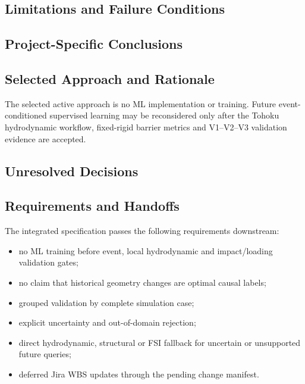 
\subsection{Limitations and Failure Conditions}
\label{sec:res-ml-spec-limitations}


\subsection{Project-Specific Conclusions}
\label{sec:res-ml-spec-conclusions}


\subsection{Selected Approach and Rationale}
\label{sec:res-ml-spec-selected-approach}

The selected active approach is no ML implementation or training.
Future event-conditioned supervised learning may be reconsidered only
after the Tohoku hydrodynamic workflow, fixed-rigid barrier metrics and
V1--V2--V3 validation evidence are accepted.

\subsection{Unresolved Decisions}
\label{sec:res-ml-spec-unresolved-decisions}


\subsection{Requirements and Handoffs}
\label{sec:res-ml-spec-requirements}

The integrated specification passes the following requirements downstream:
\begin{itemize}
  \item no ML training before event, local hydrodynamic and
    impact/loading validation gates;
  \item no claim that historical geometry changes are optimal causal labels;
  \item grouped validation by complete simulation case;
  \item explicit uncertainty and out-of-domain rejection;
  \item direct hydrodynamic, structural or FSI fallback for uncertain
    or unsupported future queries;
  \item deferred Jira WBS updates through the pending change manifest.
\end{itemize}

